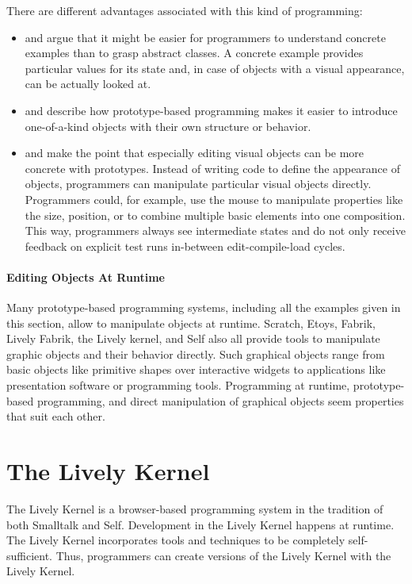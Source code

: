 There are different advantages associated with this kind of programming:
\begin{itemize}
    \item \cite{Taivalsaari1996CVP} and \cite{Ungar1987SPS} argue that it might be easier for programmers to understand concrete examples than to grasp abstract classes. A concrete example provides particular values for its state and, in case of objects with a visual appearance, can be actually looked at.
    \item \cite{Ungar1987SPS} and \cite{Borning1986CVP} describe how prototype-based programming makes it easier to introduce one-of-a-kind objects with their own structure or behavior.
    \item \cite{Borning1986CVP} and \cite{Maloney1995Mor} make the point that especially editing visual objects can be more concrete with prototypes. Instead of writing code to define the appearance of objects, programmers can manipulate particular visual objects directly. Programmers could, for example, use the mouse to manipulate properties like the size, position, or to combine multiple basic elements into one composition. This way, programmers always see intermediate states and do not only receive feedback on explicit test runs in-between edit-compile-load cycles. 
\end{itemize}

\paragraph{Editing Objects At Runtime}
Many prototype-based programming systems, including all the examples given in this section, allow to manipulate objects at runtime.
Scratch, Etoys, Fabrik, Lively Fabrik, the Lively kernel, and Self also all provide tools to manipulate graphic objects and their behavior directly.
Such graphical objects range from basic objects like primitive shapes over interactive widgets to applications like presentation software or programming tools.
Programming at runtime, prototype-based programming, and direct manipulation of graphical objects seem properties that suit each other.


\section{The Lively Kernel}

The Lively Kernel is a browser-based programming system in the tradition of both Smalltalk and Self.
Development in the Lively Kernel happens at runtime.
The Lively Kernel incorporates tools and techniques to be completely self-sufficient.
Thus, programmers can create versions of the Lively Kernel with the Lively Kernel.

